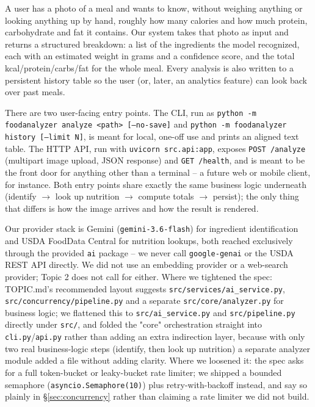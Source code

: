 \documentclass[11pt,a4paper]{article}
\begin{document}
A user has a photo of a meal and wants to know, without weighing anything or looking anything up by hand, roughly how many calories and how much protein, carbohydrate and fat it contains. Our system takes that photo as input and returns a structured breakdown: a list of the ingredients the model recognized, each with an estimated weight in grams and a confidence score, and the total kcal/protein/carbs/fat for the whole meal. Every analysis is also written to a persistent history table so the user (or, later, an analytics feature) can look back over past meals.

There are two user-facing entry points. The CLI, run as \texttt{python -m foodanalyzer analyze <path> [--no-save]} and \texttt{python -m foodanalyzer history [--limit N]}, is meant for local, one-off use and prints an aligned text table. The HTTP API, run with \texttt{uvicorn src.api:app}, exposes \texttt{POST /analyze} (multipart image upload, JSON response) and \texttt{GET /health}, and is meant to be the front door for anything other than a terminal -- a future web or mobile client, for instance. Both entry points share exactly the same business logic underneath (identify $\rightarrow$ look up nutrition $\rightarrow$ compute totals $\rightarrow$ persist); the only thing that differs is how the image arrives and how the result is rendered.

Our provider stack is Gemini (\texttt{gemini-3.6-flash}) for ingredient identification and USDA FoodData Central for nutrition lookups, both reached exclusively through the provided \texttt{ai} package -- we never call \texttt{google-genai} or the USDA REST API directly. We did not use an embedding provider or a web-search provider; Topic 2 does not call for either. Where we tightened the spec: TOPIC.md's recommended layout suggests \texttt{src/services/ai\_service.py}, \texttt{src/concurrency/pipeline.py} and a separate \texttt{src/core/analyzer.py} for business logic; we flattened this to \texttt{src/ai\_service.py} and \texttt{src/pipeline.py} directly under \texttt{src/}, and folded the "core" orchestration straight into \texttt{cli.py}/\texttt{api.py} rather than adding an extra indirection layer, because with only two real business-logic steps (identify, then look up nutrition) a separate analyzer module added a file without adding clarity. Where we loosened it: the spec asks for a full token-bucket or leaky-bucket rate limiter; we shipped a bounded semaphore (\texttt{asyncio.Semaphore(10)}) plus retry-with-backoff instead, and say so plainly in \S\ref{sec:concurrency} rather than claiming a rate limiter we did not build.
\end{document}
